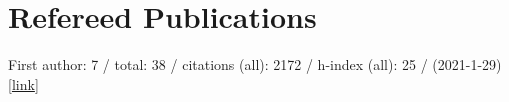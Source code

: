 \section*{Refereed Publications}

First author: 7 / total: 38 / citations (all): 2172 / h-index (all): 25 / (2021-1-29) [\href{https://ui.adsabs.harvard.edu/#/public-libraries/G0Ow9TGTRyuVT7hbhzailA}{link}]

